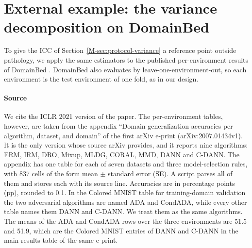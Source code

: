 \section{External example: the variance decomposition on DomainBed}
\label{app:domainbed}

To give the ICC of Section~\ref{M-sec:protocol-variance} a reference point
outside pathology, we apply the same estimators to the published
per-environment results of DomainBed \citep{gulrajani2021domainbed}. DomainBed
also evaluates by leave-one-environment-out, so each environment is the test
environment of one fold, as in our design.

\paragraph{Source} We cite the ICLR 2021 version of the paper. The
per-environment tables, however, are taken from the appendix ``Domain
generalization accuracies per algorithm, dataset, and domain'' of the first
arXiv e-print (arXiv:2007.01434v1). It is the only version whose source arXiv
provides, and it reports nine algorithms: ERM, IRM, DRO, Mixup, MLDG, CORAL,
MMD, DANN and C-DANN. The appendix has one table for each of seven datasets
and three model-selection rules, with 837 cells of the form mean $\pm$
standard error (SE). A script parses all of them and stores each with its
source line. Accuracies are in percentage points (pp), rounded to 0.1. In the
Colored MNIST table for training-domain validation the two adversarial
algorithms are named ADA and CondADA, while every other table names them DANN
and C-DANN. We treat them as the same algorithms. The means of the ADA and
CondADA rows over the three environments are 51.5 and 51.9, which are the
Colored MNIST entries of DANN and C-DANN in the main results table of the same
e-print.

